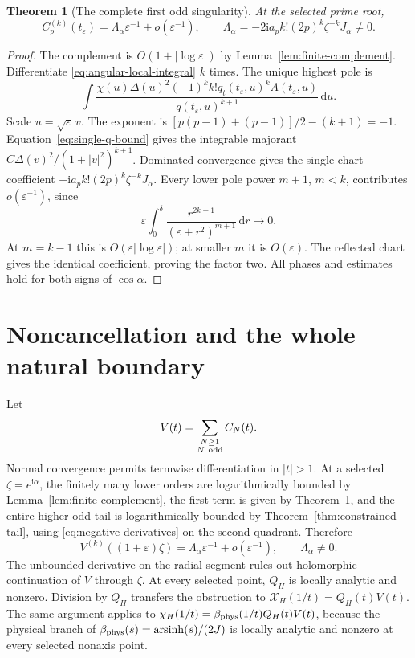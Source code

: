 \documentclass[11pt]{article}
\numberwithin{equation}{section}
\newtheorem{theorem}{Theorem}[section]
\theoremstyle{remark}\newtheorem{remark}[theorem]{Remark}
\newcommand{\ii}{\mathrm i}
\newcommand{\dd}{\mathrm d}
\newcommand{\X}{\mathcal X_H}
\begin{document}
\begin{theorem}[The complete first odd singularity]\label{thm:single-first}
At the selected prime root,
\[
 C_p^{(k)}(t_\varepsilon)=\Lambda_\alpha\varepsilon^{-1}
           +o(\varepsilon^{-1}),\qquad
 \Lambda_\alpha=-2\ii a_p k!(2p)^k\zeta^{-k}J_\alpha\ne0.
\]
\end{theorem}
\begin{proof}
The complement is $O(1+|\log\varepsilon|)$ by
Lemma~\ref{lem:finite-complement}.
Differentiate \eqref{eq:angular-local-integral} $k$ times.
The unique highest pole is
\[
 \int \frac{\chi(u)\Delta(u)^2(-1)^k k!
       q_t(t_\varepsilon,u)^k A(t_\varepsilon,u)}
                {q(t_\varepsilon,u)^{k+1}}\,\dd u.
\]
Scale $u=\sqrt\varepsilon\,v$. The exponent is
$[p(p-1)+(p-1)]/2-(k+1)=-1$.
Equation~\eqref{eq:single-q-bound} gives the integrable majorant
$C\Delta(v)^2/(1+|v|^2)^{k+1}$.
Dominated convergence gives the single-chart coefficient
$-\ii a_p k!(2p)^k\zeta^{-k}J_\alpha$.
Every lower pole power $m+1$, $m<k$, contributes $o(\varepsilon^{-1})$,
since
\[
 \varepsilon\int_0^\delta
       \frac{r^{2k-1}}{(\varepsilon+r^2)^{m+1}}\,\dd r\longrightarrow0.
\]
At $m=k-1$ this is $O(\varepsilon|\log\varepsilon|)$;
at smaller $m$ it is $O(\varepsilon)$.
The reflected chart gives the identical coefficient, proving the
factor two. All phases and estimates hold for both signs of
$\cos\alpha$.
\end{proof}

\section{Noncancellation and the whole natural boundary}
Let
\[
 V(t)=\sum_{\substack{N\ge1\\N\ {\rm odd}}}C_N(t).
\]
Normal convergence permits termwise differentiation in $|t|>1$.
At a selected $\zeta=e^{\ii\alpha}$, the finitely many lower
orders are logarithmically bounded by Lemma~\ref{lem:finite-complement},
the first term is given by Theorem~\ref{thm:single-first},
and the entire higher odd tail is logarithmically bounded by
Theorem~\ref{thm:constrained-tail}, using
\eqref{eq:negative-derivatives} on the second quadrant.
Therefore
\[
 V^{(k)}((1+\varepsilon)\zeta)
       =\Lambda_\alpha\varepsilon^{-1}+o(\varepsilon^{-1}),
 \qquad \Lambda_\alpha\ne0.
\]
The unbounded derivative on the radial segment rules out
holomorphic continuation of $V$ through $\zeta$. At every selected
point, $Q_H$ is locally analytic and nonzero. Division by $Q_H$
transfers the obstruction to $\X(1/t)=Q_H(t)V(t)$. The same
argument applies to
$\chi_H(1/t)=\beta_{\rm phys}(1/t)Q_H(t)V(t)$, because the
physical branch of $\beta_{\rm phys}(s)=\operatorname{arsinh}(s)/(2J)$
is locally analytic and nonzero at every selected nonaxis point.
\end{document}
